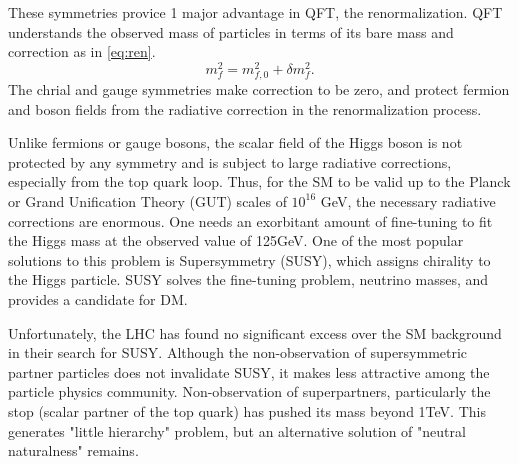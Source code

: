 These symmetries provice 1 major advantage in QFT, the renormalization.
QFT understands the observed mass of particles in terms of its bare mass and correction as in \ref{eq:ren}.
\begin{equation}
\label{eq:ren}
	m_{f}^{2}=m_{f,0}^{2}+\delta m_{f}^2.
\end{equation}
The chrial and gauge symmetries make correction to be zero, and protect fermion and boson fields from the radiative correction in the renormalization process.

Unlike fermions or gauge bosons, the scalar field of the Higgs boson is not protected by any symmetry and is subject to large radiative corrections, especially from the top quark loop. 
Thus, for the SM to be valid up to the Planck or Grand Unification Theory (GUT) scales of $10^{16}$ GeV, the necessary radiative corrections are enormous. 
One needs an exorbitant amount of fine-tuning to fit the Higgs mass at the observed value of 125GeV.
One of the most popular solutions to this problem is Supersymmetry (SUSY), which assigns chirality to the Higgs particle. 
SUSY solves the fine-tuning problem, neutrino masses, and provides a candidate for DM. 

Unfortunately, the LHC has found no significant excess over the SM background in their search for SUSY\cite{SUSY}. 
Although the non-observation of supersymmetric partner particles does not invalidate SUSY, it makes less attractive among the particle physics community. 
Non-observation of superpartners, particularly the stop (scalar partner of the top quark) has pushed its mass beyond 1TeV. 
This generates "little hierarchy" problem, but an alternative solution of "neutral naturalness" remains. 

